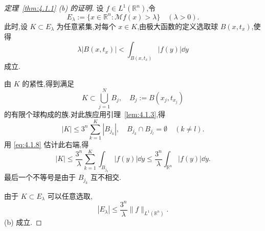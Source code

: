 \begin{proof}[定理~\ref{thm:4.1.1} (b) 的证明]
设 $f \in L^{1}(\mathbb{R}^{n})$,令
\begin{equation*}
E_{\lambda} := \{x \in \mathbb{R}^{n}: \mathcal{M}f(x) > \lambda\} \quad (\lambda > 0).
\end{equation*}
此时,设 $K \subset E_{\lambda}$ 为任意紧集,对每个 $x \in K$,由极大函数的定义选取球 $B(x, t_{x})$,使得
\begin{equation}
\lambda|B(x, t_{x})| < \int_{B(x, t_{x})}|f(y)|\dd y\tag{4.1.8}
\label{eq:4.1.8}\end{equation}
成立.

由 $K$ 的紧性,得到满足
\begin{equation*}
K \subset \bigcup_{j=1}^{N}B_{j}, \quad B_{j} := B(x_{j}, t_{x_{j}})
\end{equation*}
的有限个球构成的族.对此族应用引理~\ref{lem:4.1.3},得
\begin{equation*}
|K| \leq 3^{n}\sum_{k=1}^{K}|B_{j_{k}}|, \quad B_{j_{k}} \cap B_{j_{l}} = \emptyset \quad (k \neq l).
\end{equation*}
用 \eqref{eq:4.1.8} 估计此右端,得
\begin{equation*}
|K| \leq \frac{3^{n}}{\lambda}\sum_{k=1}^{K}\int_{B_{j_{k}}}|f(y)|\dd y \leq \frac{3^{n}}{\lambda}\int_{\mathbb{R}^{n}}|f(y)|\dd y.
\end{equation*}
最后一个不等号是由于 $B_{j_{k}}$ 互不相交.

由于 $K \subset E_{\lambda}$ 可以任意选取,
\begin{equation*}
|E_{\lambda}| \leq \frac{3^{n}}{\lambda}\|f\|_{L^{1}(\mathbb{R}^{n})}.
\end{equation*}
(b) 成立.
\end{proof}

